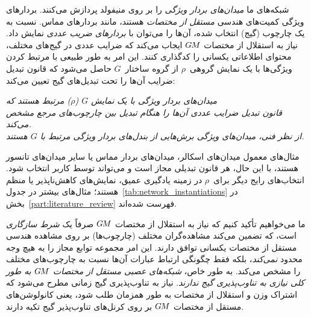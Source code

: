 شبکه‌های ما \emph{میدان‌های بردار ویژگی} را بر روی منیفولد پردازش می‌کنند.
بردارهای ویژگی کمیت‌های هندسی \emph{مستقل از مختصات} هستند، مانند بردارهای مماس.
نسبت به یک چارچوب (گیج) انتخاب شده، آن‌ها را می‌توان با \emph{بردارهای ضریب عددی} نمایش داد.
نیاز به استقلال از مختصات $G\mkern-1.4muM$ ایجاب می‌کند که ضرایب عددی در گیج‌های مختلف، محتوای اطلاعاتی یکسانی را کدگذاری کنند.
این امر به طور طبیعی با مرتبط کردن ویژگی‌ها با یک نمایش گروهی~$\rho$ از گروه ساختار~$G$ حاصل می‌شود که قانون تبدیل ضرایب آن‌ها را تحت تبدیل‌های گیج تعیین می‌کند:
\begin{center}\it
	میدان‌های بردار ویژگی با یک نمایش $G$ ($\rho$) مرتبط هستند که \\
	قانون تبدیل ضرایب عددی آن‌ها را هنگام تبدیل بین چارچوب‌های مرجع مشخص می‌کند.
	\\[1ex]
	از نظر فنی، میدان‌های ویژگی برش‌هایی از بندل‌های بردار ویژگی مرتبط با $G$ هستند.
\end{center}
مثال‌های معمول میدان‌های اسکالر، میدان‌های بردار مماس یا سایر میدان‌های تانسور هستند، با این حال، هر قانون تبدیلی مجاز است و می‌تواند توسط کاربر انتخاب شود.
انتخاب‌های رایج دیگر برای~$\rho$ در زمینه یادگیری عمیق، نمایش‌های کاهش‌ناپذیر یا منظم هستند؛
مثال‌های بیشتر در جدول~\ref{tab:network_instantiations} در بخش~\ref{part:literature_review} فهرست شده‌اند.


ما می‌خواهیم تأکید کنیم که نیاز به استقلال از مختصات $G\mkern-1.4muM$ صرفاً یک \emph{شرط سازگاری} است، که تضمین می‌کند مشاهده‌گران مختلف (چارچوب‌ها) بر روی مشاهده هندسی مستقل از مختصات یکسانی توافق دارند.
این امر مجموعه توابع مجاز را به هیچ وجه محدود \emph{نمی‌کند}، بلکه فقط چگونگی ارتباط عبارات آن‌ها نسبت به چارچوب‌های مختلف را مشخص می‌کند.
به طور خاص، \emph{شبکه‌های عصبی مستقل از مختصات $G\mkern-1.4muM$ به طور کلی نیازی به تناوب‌پذیری گیج ندارند}.
نیاز به تناوب‌پذیری گیج زمانی مطرح می‌شود که اشتراک وزن و استقلال از مختصات به طور همزمان طلب شود، یعنی کانولوشن‌های مستقل از مختصات $G\mkern-1.4muM$ بر روی کرنل‌های تناوب‌پذیر گیج تکیه دارند.